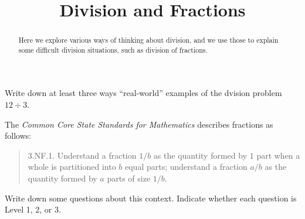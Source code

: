 \documentclass[handout]{ximera}
\title{Division and Fractions}
\begin{document}
\begin{abstract}
Here we explore various ways of thinking about division, and we use those to explain some difficult division situations, such as division of fractions.
\end{abstract}
\maketitle

\begin{problem}
Write down at least three ways ``real-world'' examples of the dvision problem $12\div 3$.  
\end{problem}

The \emph{Common Core State Standards for Mathematics} describes fractions as follows: 

\begin{quote}
3.NF.1. Understand a fraction $1/b$ as the quantity formed by $1$ part when a
whole is partitioned into $b$ equal parts; understand a fraction $a/b$ as
the quantity formed by $a$ parts of size $1/b$.
\end{quote}


\begin{problem}
Write down some questions about this context.  Indicate whether each question is Level 1, 2, or 3.  
\end{problem}

%
%
%
%
%
\end{document}
